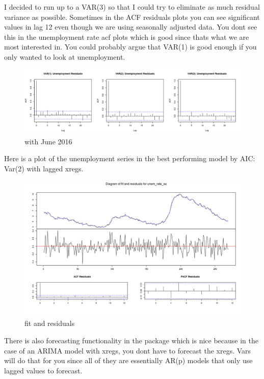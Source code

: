 \documentclass[twoside,twocolumn]{article}
\begin{document}
I decided to run up to a VAR(3) so that I could try to eliminate as much residual variance as possible. Sometimes in the ACF residuals plots you can see significant values in lag 12 even though we are using seasonally adjusted data. You dont see this in the unemployment rate acf plots which is good since thats what we are most interested in. You could probably argue that VAR(1) is good enough if you only wanted to look at unemployment. 

  \begin{figure}[H]
    	\centering
     	\caption{with June 2016}
     	\includegraphics[width=\linewidth]{images/varUnemresid}
 \end{figure}
 
 Here is a plot of the unemployment series in the best performing model by AIC: Var(2) with lagged xregs.
 
   \begin{figure}[H]
    	\centering
     	\caption{fit and residuals}
     	\includegraphics[width=\linewidth]{images/unem_rate_fit_resid}
 \end{figure}
 
 There is also forecasting functionality in the package which is nice because in the case of an ARIMA model with xregs, you dont have to forecast the xregs. Vars will do that for you since all of they are essentially AR(p) models that only use lagged values to forecast.
 
\end{document}
